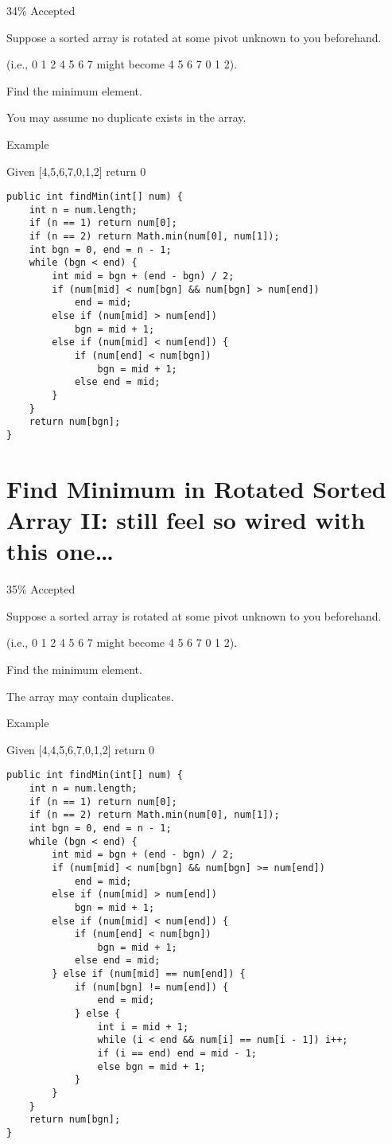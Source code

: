 \documentclass[12pt]{book}
\begin{document}
34\% Accepted

Suppose a sorted array is rotated at some pivot unknown to you beforehand.

(i.e., 0 1 2 4 5 6 7 might become 4 5 6 7 0 1 2).

Find the minimum element.

You may assume no duplicate exists in the array.

Example

Given [4,5,6,7,0,1,2] return 0
\lstset{language=java,label= ,caption= ,numbers=none}
\begin{lstlisting}
public int findMin(int[] num) {
    int n = num.length;
    if (n == 1) return num[0];
    if (n == 2) return Math.min(num[0], num[1]);
    int bgn = 0, end = n - 1;
    while (bgn < end) {
        int mid = bgn + (end - bgn) / 2;
        if (num[mid] < num[bgn] && num[bgn] > num[end])
            end = mid;
        else if (num[mid] > num[end])
            bgn = mid + 1;
        else if (num[mid] < num[end]) {
            if (num[end] < num[bgn])
                bgn = mid + 1;
            else end = mid;
        }  
    }
    return num[bgn];
}
\end{lstlisting}
\chapter{Find Minimum in Rotated Sorted Array II: still feel so wired with this one\ldots{}}
\label{sec-27}

35\% Accepted

Suppose a sorted array is rotated at some pivot unknown to you beforehand.

(i.e., 0 1 2 4 5 6 7 might become 4 5 6 7 0 1 2).

Find the minimum element.

The array may contain duplicates.

Example

Given [4,4,5,6,7,0,1,2] return 0
\lstset{language=java,label= ,caption= ,numbers=none}
\begin{lstlisting}
public int findMin(int[] num) {
    int n = num.length;
    if (n == 1) return num[0];
    if (n == 2) return Math.min(num[0], num[1]);
    int bgn = 0, end = n - 1;
    while (bgn < end) {
        int mid = bgn + (end - bgn) / 2;
        if (num[mid] < num[bgn] && num[bgn] >= num[end])
            end = mid;
        else if (num[mid] > num[end])
            bgn = mid + 1;
        else if (num[mid] < num[end]) {
            if (num[end] < num[bgn])
                bgn = mid + 1;
            else end = mid;
        } else if (num[mid] == num[end]) {
            if (num[bgn] != num[end]) {
                end = mid;
            } else {
                int i = mid + 1;
                while (i < end && num[i] == num[i - 1]) i++;
                if (i == end) end = mid - 1;
                else bgn = mid + 1;
            }
        }
    }
    return num[bgn];
}
\end{lstlisting}
\end{document}
